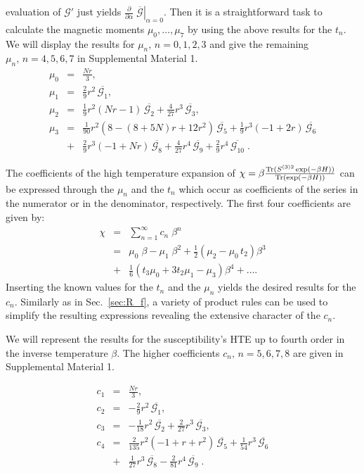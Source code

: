 \documentclass[aps,twocolumn,groupedaddress]{revtex4}
\begin{document}
evaluation of ${\mathcal G}'$ just yields
$\left.\frac{\partial}{\partial\alpha}\;\overline{\mathcal
G}\right|_{\alpha=0}$. Then it is a straightforward task to
calculate the magnetic moments $\mu_0,\ldots,\mu_7$ by using the
above results for the $t_n$. We will display the results for
$\mu_n,\,n=0,1,2,3$ and give the remaining $\mu_n,\,n=4,5,6,7$ in
Supplemental Material 1.\cite{supp1}
\begin{eqnarray}\label{rma}
\mu_0&=&\frac{Nr}{3},\\ \label{rmb} \mu_1&=& \frac{2}{9} r^2
\,\overline{{\mathcal G}_1},\\ \label{rmc} \mu_2&=& \frac{1}{9} r^2
(Nr-1)\,\overline{{\mathcal G}_2}+\frac{4}{27} r^3
\,\overline{{\mathcal G}_3},\\ \nonumber \mu_3 &=& \frac{1}{90} r^2
(8 - (8+5N)r + 12 r^2)\,\overline{{\mathcal G}_5} +\frac{1}{9} r^3
(-1+2r)\,\overline{{\mathcal G}_6}\\ \label{rmd} &+&\frac{2}{9}
r^3(-1+Nr) \,\overline{{\mathcal G}_8} +\frac{4}{27} r^4 \,
\overline{{\mathcal G}_9} +\frac{2}{9} r^4 \, \overline{{\mathcal
G}_{10}} \;.
\end{eqnarray}


The coefficients of the high temperature expansion of $\chi=\beta
\frac{\mbox{\scriptsize Tr}({S}^{(3)2}\exp(-\beta
H))}{\mbox{\scriptsize Tr}(\exp(-\beta H))}$ can be expressed
through the $\mu_n$ and the $t_n$ which occur as coefficients of the
series in the numerator or in the denominator, respectively. The
first four coefficients are given by:
\begin{eqnarray} \nonumber
\chi&=&\sum_{n=1}^\infty c_n\;\beta^n\\ \nonumber
&=&\mu_0\;\beta-\mu_1\;\beta^2 +
\frac{1}{2}(\mu_2-\mu_0\,t_2)\beta^3\\ &+&
\frac{1}{6}(t_3\mu_0+3 t_2 \mu_1-\mu_3)\beta^4 +\ldots. \label{r9}
\end{eqnarray}
Inserting the known values for the $t_n$ and the $\mu_n$ yields the
desired results for the $c_n$. Similarly as in
Sec.~\ref{sec:R_f}, a variety of product rules can be used to simplify
the resulting expressions revealing the extensive character of the
$c_n$.

We will represent the results for the susceptibility's HTE up to
fourth order in the inverse temperature $\beta$. The higher
coefficients $c_n,\,n=5,6,7,8$ are given in Supplemental Material 1.\cite{supp1}

\begin{eqnarray}\label{r10a}
c_1&=&\frac{Nr}{3},\\ \label{r10b} c_2&=& -\frac{2}{9} r^2
\,\overline{{\mathcal G}_1},\\ \label{r10c} c_3&=& -\frac{1}{18} r^2
\,\overline{{\mathcal G}_2}+\frac{2}{27} r^3 \,\overline{{\mathcal
G}_3},\\ \nonumber c_4 &=& \frac{2}{135} r^2 (-1 + r +
r^2)\,\overline{{\mathcal G}_5} +\frac{1}{54} r^3
\,\overline{{\mathcal G}_6}\\ \label{r10d} &+&\frac{1}{27} r^3
\,\overline{{\mathcal G}_8} -\frac{2}{81} r^4 \, \overline{{\mathcal
G}_9} \;.
\end{eqnarray}
\end{document}
